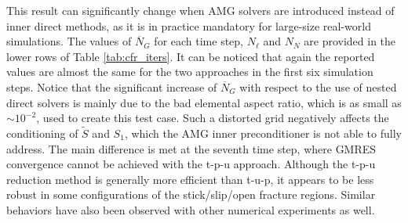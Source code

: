 \documentclass[3p,times]{elsarticle}
\theoremstyle{plain}
\newcommand{\tS}{\widetilde{S}}
\begin{document}
This result can significantly change when AMG solvers are introduced instead of inner direct methods, as it is in practice mandatory for large-size real-world simulations. The values of $\overline{N}_G$ for each time step, $N_{\ell}$ and $N_N$ are provided in the lower rows of Table \ref{tab:cfr_iters}.
It can be noticed that again the reported values are
almost the same for the two approaches in the first six simulation steps. %
Notice that the significant increase of $\overline{N}_G$ with respect to the use of nested direct solvers is mainly due to the bad elemental aspect ratio, which is as small as $\sim\! 10^{-2}$,
used to create this test case. Such a distorted grid negatively affects the conditioning of $\tS$ and $S_1$, which the AMG inner preconditioner is not able to fully address.
%
%
The main difference is met at the seventh time step, where GMRES convergence cannot be achieved with the t-p-u approach.
Although the t-p-u reduction method is generally more efficient than t-u-p, it appears to be less robust in some configurations of the stick/slip/open fracture regions.
Similar
behaviors have also been observed with other numerical experiments as well. 
\end{document}
